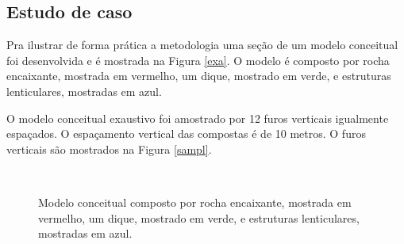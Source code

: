 \subsection{Estudo de caso}

Pra ilustrar de forma prática a metodologia uma seção de um modelo conceitual foi desenvolvida e é mostrada na Figura \autoref{exa}. O modelo é composto por rocha encaixante, mostrada em vermelho, um dique, mostrado em verde, e estruturas lenticulares, mostradas em azul.

O modelo conceitual exaustivo  foi amostrado por 12 furos verticais igualmente espaçados. O espaçamento vertical das compostas é de 10 metros. O furos verticais são mostrados na Figura \autoref{sampl}. 

\begin{figure}[H] 
    \centering
    \caption{Modelo conceitual composto por rocha encaixante, mostrada em vermelho, um dique, mostrado em verde, e estruturas lenticulares, mostradas em azul.} \label{concep_exhaust}
     \\
\end{figure}

